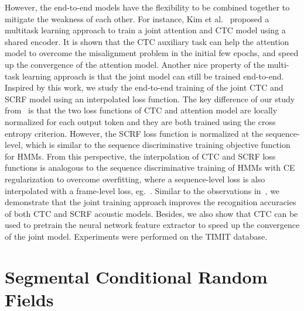 \documentclass[a4paper]{article}
\begin{document}
However, the end-to-end models have the flexibility to be combined together to mitigate the weakness of each other. For instance, Kim et al.~\cite{kim2016joint} proposed a multitask learning approach to train a joint attention and CTC model using a shared encoder. It is shown that the CTC auxiliary task can help the attention model to overcome the misalignment problem in the initial few epochs, and speed up the convergence of the attention model. Another nice property of the multi-task learning approach is that the joint model can still be trained end-to-end. Inspired by this work, we study the end-to-end training of the joint CTC and SCRF model using an interpolated loss function. The key difference of our study from~\cite{kim2016joint} is that the two loss functions of CTC and attention model are locally normalized for each output token and they are both trained using the cross entropy criterion. However, the SCRF loss function is normalized at the sequence-level, which is similar to the sequence discriminative training objective function for HMMs. From this perspective, the interpolation of CTC and SCRF loss functions is analogous to the sequence discriminative training of HMMs with CE regularization to overcome overfitting, where a sequence-level loss is also interpolated with a frame-level loss, eg.~\cite{su2013error}. Similar to the observations in~\cite{kim2016joint}, we demonstrate that the joint training approach improves the recognition accuracies of both CTC and SCRF acoustic models. Besides, we also show that CTC can be used to pretrain the neural network feature extractor to speed up the convergence of the joint model. Experiments were performed on the TIMIT database. 

\section{Segmental Conditional Random Fields}
\label{sec:scrf}
\end{document}
